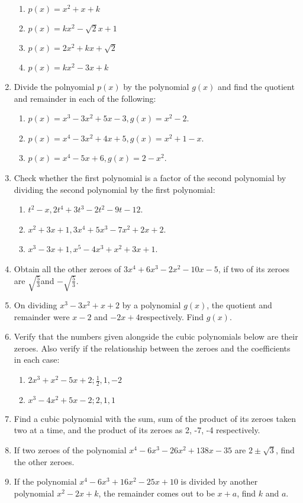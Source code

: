 \begin{enumerate}[label=\thesubsection.\arabic*, ref=\thesubsection.\theenumi,resume*]
\begin{enumerate}
\item $p(x) = x^2 + x + k$
\item $p(x) = kx^2-\sqrt{2}x+1$
\item $p(x) = 2x^2 + kx + \sqrt{2}$
\item $p(x) = kx^2  - 3x + k$
\end{enumerate}
\item Divide the polnyomial $p(x)$ by the polynomial $g(x)$ and find the quotient and remainder in each of the following:
\begin{enumerate}
\item $p(x) = x^3-3x^2+5x-3, g(x) = x^2-2$.
\item $p(x) = x^4-3x^2+4x+5, g(x) = x^2+1-x$.
\item $p(x) = x^4-5x+6, g(x) = 2-x^2$.
\end{enumerate}
\item Check whether the first polynomial is a factor of the second polynomial by dividing the second polynomial by the first polynomial:
\begin{enumerate}
\item $t^2-x,2t^4+3t^3-2t^2-9t-12$.
\item $x^2+3x+1, 3x^4+5x^3-7x^2+2x+2$.
\item $x^3-3x+1, x^5-4x^3+x^2+3x+1$.
\end{enumerate}
%
\item Obtain all the other zeroes of $3x^4+6x^3-2x^2-10x-5$, if two of its zeroes are $\sqrt{\frac{5}{3}}$and $-\sqrt{\frac{5}{3}}$.
\item On dividing $x^3-3x^2+x+2$ by a polynomial $g(x)$, the quotient and remainder were $x-2$ and $-2x+4$respectively.  Find $g(x)$.
\item Verify that the numbers given alongside the cubic polynomials below are their zeroes.  Also verify if the relationship between the zeroes and the coefficients in each case:
\begin{enumerate}
\item $2x^3+x^2-5x+2; \frac{1}{2}, 1, -2$
\item $x^3-4x^2+5x-2; 2, 1, 1$
\end{enumerate}
\item Find a cubic polynomial with the sum, sum of the product of its zeroes taken two at a time, and the product of its zeroes as 2, -7, -4 respectively.
\item If two zeroes of the polynomial $x^4-6x^3-26x^2+138x-35$ are $2\pm \sqrt{3}$, find the other zeroes.\item If the polynomial $x^4-6x^3+16x^2-25x+10$ is divided by another polynomial $x^2-2x+k$, the remainder comes out to be $x+a$, find $k$ and $a$.

\end{enumerate}
